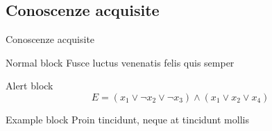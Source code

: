 \documentclass{beamer}
\begin{document}
	\subsection{Conoscenze acquisite}

	\begin{frame}{Conoscenze acquisite}
		\begin{block}{Normal block}
			Fusce luctus venenatis felis quis semper
		\end{block}

		\begin{alertblock}{Alert block}
			$$ E = (x_1 \vee \neg x_2 \vee \neg x_3) \wedge (x_1 \vee x_2 \vee x_4) $$
		\end{alertblock}

		\begin{exampleblock}{Example block}
			Proin tincidunt, neque at tincidunt mollis
		\end{exampleblock}
	\end{frame}
\end{document}
